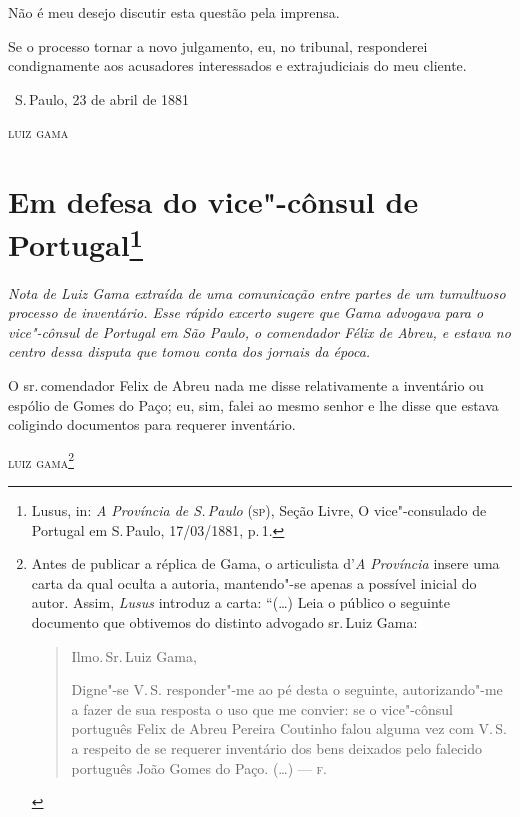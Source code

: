 Não é meu desejo discutir esta questão pela imprensa.

Se o processo tornar a novo julgamento, eu, no tribunal, responderei
condignamente aos acusadores interessados e extrajudiciais do meu
cliente.

\vfill

\hfill\ S.\,Paulo, 23 de abril de 1881\enlargethispage{\baselineskip}

\hfill\textsc{luiz gama}

\chapter{Em defesa do vice"-cônsul de Portugal\footnote[*]{Lusus, in: \emph{A Província de S.\,Paulo} (\textsc{sp}), Seção Livre, O vice"-consulado de Portugal em S.\,Paulo, 17/03/1881, p.\,1.}}

\begin{flushleft}
{\footnotesize\itshape
Nota de Luiz Gama extraída de uma comunicação entre partes de um
tumultuoso processo de inventário. Esse rápido excerto sugere que Gama
advogava para o vice"-cônsul de Portugal em São Paulo, o comendador Félix
de Abreu, e estava no centro dessa disputa que tomou conta dos jornais
da época.}
\end{flushleft}

\noindent{}O sr.\,comendador Felix de Abreu nada me disse relativamente a inventário
ou espólio de Gomes do Paço; eu, sim, falei ao mesmo senhor e lhe disse
que estava coligindo documentos para requerer inventário.

\bigskip

\hfill\textsc{luiz gama}\footnote{Antes de publicar a réplica de Gama, o
  articulista d'\emph{A Província} insere uma carta da qual
  oculta a autoria, mantendo"-se apenas a possível inicial do autor.
  Assim, \emph{Lusus} introduz a carta: ``(\ldots{}) Leia o público o seguinte
  documento que obtivemos do distinto advogado sr.\,Luiz Gama:

\begin{quote}\footnotesize
Ilmo.\,Sr.\,Luiz Gama,

  Digne"-se V.\,S. responder"-me ao pé desta o seguinte, autorizando"-me a
  fazer de sua resposta o uso que me convier: se o vice"-cônsul português
  Felix de Abreu Pereira Coutinho falou alguma vez com V.\,S. a respeito
  de se requerer inventário dos bens deixados pelo falecido português
  João Gomes do Paço. (\ldots{}) --- \textsc{f}.
  \end{quote}}


